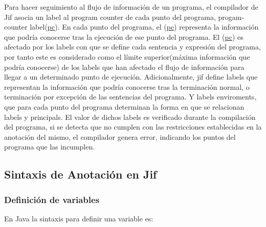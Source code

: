 Para hacer seguimiento al flujo de información de un programa, el compilador de
Jif asocia un label al program counter de cada punto del programa,
progam-counter label(\underline{pc}). En cada punto del programa, el
(\underline{pc}) representa la información que podría conocerse tras la
ejecución de ese punto del programa.
El (\underline{pc}) es afectado por los labels con que se define cada sentencia
y expresión del programa, por tanto este es considerado como el límite
superior(máxima información que podría conocerse) de los labels que han afectado
el flujo de información para llegar a un determinado punto de ejecución.\newline
Adicionalmente, jif define labels que representan la información que podría
conocerse tras la terminación normal, o terminación por excepción de las
sentencias del programa. Y labels enviroments, que para cada punto del programa
determinan la forma en que se relacionan labels y principals.\newline
El valor de dichos labels es verificado durante la compilación del programa, si
se detecta que no cumplen con las restricciones establecidas en la anotación del
mismo, el compilador genera error, indicando los puntos del programa que las
incumplen.\newline



\subsection{Sintaxis de Anotación en Jif}
\label{sssec:JifSintax} 

\subsubsection{Definición de variables}
En Java la sintaxis para definir una variable es:

